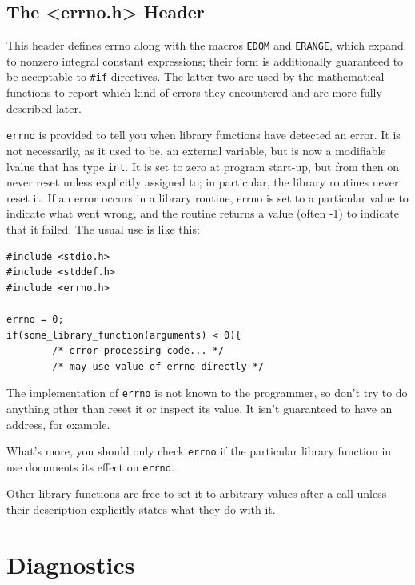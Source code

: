   

  \subsection{The <errno.h> Header}
   

   This header defines errno along with the macros \texttt{EDOM} and
    \texttt{ERANGE}, which expand to nonzero integral constant
    expressions; their form is additionally guaranteed to be
    acceptable to \texttt{\#if} directives.  The latter two are used by
    the mathematical functions to report which kind of errors
    they encountered and are more fully described later.


   \texttt{errno} is provided to tell you when library functions have
    detected an error.  It is not necessarily, as it used to be,
    an external variable, but is now a modifiable lvalue that
    has type \texttt{int}.  It is set to zero at program start-up, but
    from then on never reset unless explicitly assigned to; in
    particular, the library routines never reset it.  If an
    error occurs in a library routine, errno is set to a
    particular value to indicate what went wrong, and the
    routine returns a value (often -1) to indicate that it
    failed.  The usual use is like this:


   \begin{Verbatim}
#include <stdio.h>
#include <stddef.h>
#include <errno.h>

errno = 0;
if(some_library_function(arguments) < 0){
        /* error processing code... */
        /* may use value of errno directly */
\end{Verbatim}

   The implementation of \texttt{errno} is not known to the  programmer,
    so  don't  try to do anything other than reset it or inspect
    its value.  It isn't guaranteed  to  have  an  address,  for
    example.


   What's more, you should only check \texttt{errno} if the particular
    library function in use documents its effect on \texttt{errno}.


   Other library functions are free  to  set  it  to  arbitrary
    values  after  a  call  unless  their description explicitly
    states what they do with it.


  

 
        \section{Diagnostics}
        

